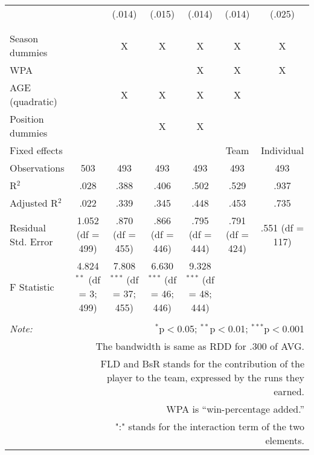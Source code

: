 \begin{table}[H]
\begin{tabular}{@{\extracolsep{-15pt}}lcccccc}
  &  & (.014) & (.015) & (.014) & (.014) & (.025) \\
  & & & & & & \\
\hline \\[-1.8ex]
Season dummies &  & X & X & X & X & X \\
WPA &  &  &  & X & X & X \\
AGE (quadratic) &  & X & X & X & X &  \\
Position dummies &  &  & X & X &  &  \\
Fixed effects &  &  &  &  & Team & Individual \\
Observations & 503 & 493 & 493 & 493 & 493 & 493 \\
R$^{2}$ & .028 & .388 & .406 & .502 & .529 & .937 \\
Adjusted R$^{2}$ & .022 & .339 & .345 & .448 & .453 & .735 \\
Residual Std. Error & 1.052 (df = 499) & .870 (df = 455) & .866 (df = 446) & .795 (df = 444) & .791 (df = 424) & .551 (df = 117) \\
F Statistic & 4.824$^{**}$ (df = 3; 499) & 7.808$^{***}$ (df = 37; 455) & 6.630$^{***}$ (df = 46; 446) & 9.328$^{***}$ (df = 48; 444) &  &  \\
\hline
\hline \\[-1.8ex]
\textit{Note:}  & \multicolumn{6}{r}{$^{*}$p$<$0.05; $^{**}$p$<$0.01; $^{***}$p$<$0.001} \\
& \multicolumn{6}{r}{The bandwidth is same as RDD for .300 of AVG.} \\
& \multicolumn{6}{r}{FLD and BsR stands for the contribution of the player to the team, expressed by the runs they earned.} \\
& \multicolumn{6}{r}{WPA is ``win-percentage added.''} \\
& \multicolumn{6}{r}{":" stands for the interaction term of the two elements.} \\
\end{tabular}
\end{table}
